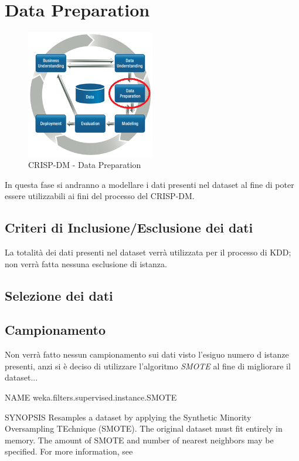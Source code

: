 \chapter{Data Preparation}

\begin{figure}[hbtp]
	\centering
	\includegraphics[width=0.5\textwidth]{./images/CRISPDM_3.png}
	\caption{CRISP-DM - Data Preparation}
	\label{CRISPDM_3}
\end{figure}

In questa fase si andranno a modellare i dati presenti nel dataset al fine di poter essere utilizzabili ai fini del processo del CRISP-DM.

\section{Criteri di Inclusione/Esclusione dei dati}

La totalità dei dati presenti nel dataset verrà utilizzata per il processo di KDD; non verrà fatta nessuna esclusione di istanza.

\section{Selezione dei dati}

\section{Campionamento}

Non verrà fatto nessun campionamento sui dati visto l'esiguo numero d istanze presenti, anzi si è deciso di utilizzare l'algoritmo \textit{SMOTE} al fine di migliorare il dataset... 

NAME
weka.filters.supervised.instance.SMOTE

SYNOPSIS
Resamples a dataset by applying the Synthetic Minority Oversampling TEchnique (SMOTE). The original dataset must fit entirely in memory. The amount of SMOTE and number of nearest neighbors may be specified. For more information, see 

